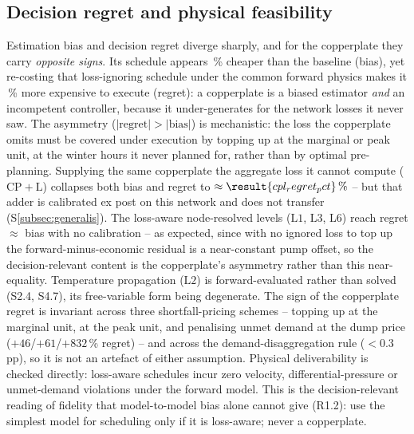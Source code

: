 \documentclass[a4paper,fleqn]{cas-dc}
\newcommand{\CPL}{\ensuremath{\mathrm{CP{+}L}}} %
\newcommand{\Lone}{\ensuremath{\mathrm{L1}}}    %
\newcommand{\Ltwo}{\ensuremath{\mathrm{L2}}}    %
\newcommand{\Lthree}{\ensuremath{\mathrm{L3}}}  %
\newcommand{\Lsix}{\ensuremath{\mathrm{L6}}}    %
\begin{document}
\subsection{Decision regret and physical feasibility}
Estimation bias and decision regret diverge sharply, and for the copperplate they
carry \emph{opposite signs}. Its schedule appears \,\% cheaper
than the baseline (bias), yet re-costing that loss-ignoring schedule under the common
forward physics makes it \,\% more expensive to execute
(regret): a copperplate is a biased estimator \emph{and} an incompetent controller,
because it under-generates for the network losses it never saw. The asymmetry
($|\text{regret}|>|\text{bias}|$) is mechanistic: the loss the copperplate omits must
be covered under execution by topping up at the marginal or peak unit, at the winter
hours it never planned for, rather than by optimal pre-planning. Supplying the same
copperplate the aggregate loss it cannot compute (\CPL) collapses both bias and regret
to $\approx\result{cpl_regret_pct}\,\%$ -- but that adder is calibrated ex post on this
network and does not transfer (S\ref{subsec:generalis}). The loss-aware node-resolved levels
(\Lone, \Lthree, \Lsix) reach regret $\approx$ bias with no calibration -- as expected, since with
no ignored loss to top up the forward-minus-economic residual is a near-constant pump offset, so
the decision-relevant content is the copperplate's asymmetry rather than this near-equality.
Temperature propagation (\Ltwo) is forward-evaluated rather than solved (S2.4, S4.7), its
free-variable form being degenerate. The sign of the
copperplate regret is invariant across three shortfall-pricing schemes -- topping up at
the marginal unit, at the peak unit, and penalising unmet demand at the dump price
($+46$/$+61$/$+832$\,\% regret) -- and across the demand-disaggregation rule
($<0.3$\,pp), so it is not an artefact of either assumption. Physical deliverability is
checked directly: loss-aware schedules incur zero velocity, differential-pressure or
unmet-demand violations under the forward model. This is the decision-relevant reading of
fidelity that model-to-model bias alone cannot give (R1.2): use the simplest model for
scheduling only if it is loss-aware; never a copperplate.

\end{document}
